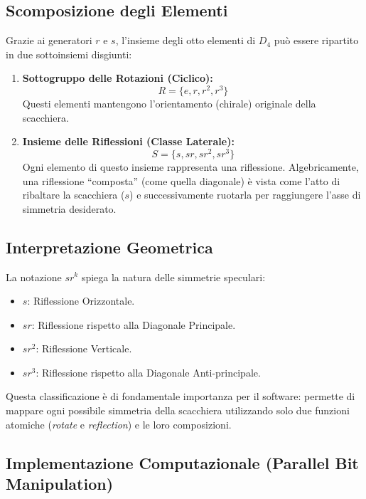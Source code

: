 \subsection{Scomposizione degli Elementi}
Grazie ai generatori $r$ e $s$, l'insieme degli otto elementi di $D_4$ può essere ripartito in due sottoinsiemi disgiunti:
\begin{enumerate}
    \item \textbf{Sottogruppo delle Rotazioni (Ciclico):} 
    \begin{equation}
        R = \{e, r, r^2, r^3\}
    \end{equation}
    Questi elementi mantengono l'orientamento (chirale) originale della scacchiera.
    
    \item \textbf{Insieme delle Riflessioni (Classe Laterale):}
    \begin{equation}
        S = \{s, sr, sr^2, sr^3\}
    \end{equation}
    Ogni elemento di questo insieme rappresenta una riflessione. Algebricamente, una riflessione ``composta'' (come quella diagonale) è vista come l'atto di ribaltare la scacchiera ($s$) e successivamente ruotarla per raggiungere l'asse di simmetria desiderato.
\end{enumerate}

\subsection{Interpretazione Geometrica}
La notazione $sr^k$ spiega la natura delle simmetrie speculari:
\begin{itemize}
    \item $s$: Riflessione Orizzontale.
    \item $sr$: Riflessione rispetto alla Diagonale Principale.
    \item $sr^2$: Riflessione Verticale.
    \item $sr^3$: Riflessione rispetto alla Diagonale Anti-principale.
\end{itemize}
Questa classificazione è di fondamentale importanza per il software: permette di mappare ogni possibile simmetria della scacchiera utilizzando solo due funzioni atomiche (\textit{rotate} e \textit{reflection}) e le loro composizioni.

\subsection{Implementazione Computazionale (Parallel Bit Manipulation)}

